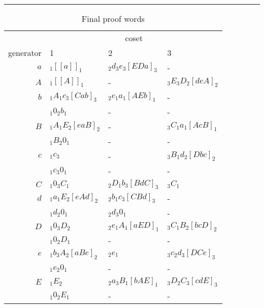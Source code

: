 \begin{table}
\hrule
\caption{Final proof words}
\label{tab:prf}
\smallskip
\renewcommand{\arraystretch}{0.900}
\begin{tabular*}{\textwidth}{@{\extracolsep{\fill}}rlll} 
\hline\hline
 & \multicolumn{3}{c}{coset} \\
\cline{2-4}
generator & 1           & 2                 & 3 \\ 
\hline
$a$ & $_1[[a]]_1$       & $_2d_3e_3[EDa]_3$ & - \\
%
$A$ & $_1[[A]]_1$       & -                 & $_3E_3D_2[deA]_2$ \\
%
$b$ & $_1A_1c_3[Cab]_3$ & $_2e_1a_1[AEb]_1$ & - \\
    & $_1 0_2 b_1$      & -                 & - \\
%
$B$ & $_1A_1E_2[eaB]_2$ & -                 & $_3C_1a_1[AcB]_1$ \\
    & $_1 B_2 0_1$      & -                 & - \\
%
$c$ & $_1c_3$           & -                 & $_3B_1d_2[Dbc]_2$ \\
    & $_1 c_3 0_1$      & -                 & - \\
%
$C$ & $_1 0_3 C_1$      & $_2D_1b_3[BdC]_3$ & $_3C_1$ \\
%
$d$ & $_1a_1E_2[eAd]_2$ & $_2b_1c_3[CBd]_3$ & - \\
    & $_1 d_2 0_1$      & $_2 d_3 0_1$      & - \\
%
$D$ & $_1 0_3 D_2$      & $_2e_1A_1[aED]_1$ & $_3C_1B_2[bcD]_2$ \\
    & $_1 0_2 D_1$      & -                 & - \\
%
$e$ & $_1b_3A_2[aBe]_2$ & $_2e_1$           & $_3c_2d_3[DCe]_3$ \\
    & $_1 e_2 0_1$      & -                 & - \\
%
$E$ & $_1E_2$           & $_2a_3B_1[bAE]_1$ & $_3D_2C_3[cdE]_3$ \\
    & $_1 0_2 E_1$      & -                 & - \\
\hline\hline
\end{tabular*}
\end{table}

